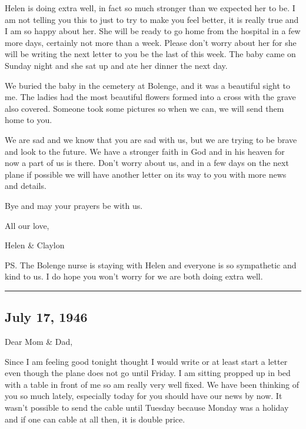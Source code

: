 \documentclass[
]{book}
\begin{document}
Helen is doing extra well, in fact so much stronger than we expected her to be. I am not telling you this to just to try to make you feel better, it is really true and I am so happy about her. She will be ready to go home from the hospital in a few more days, certainly not more than a week. Please don't worry about her for she will be writing the next letter to you be the last of this week. The baby came on Sunday night and she sat up and ate her dinner the next day.

We buried the baby in the cemetery at Bolenge, and it was a beautiful sight to me. The ladies had the most beautiful flowers formed into a cross with the grave also covered. Someone took some pictures so when we can, we will send them home to you.

We are sad and we know that you are sad with us, but we are trying to be brave and look to the future. We have a stronger faith in God and in his heaven for now a part of us is there. Don't worry about us, and in a few days on the next plane if possible we will have another letter on its way to you with more news and details.

Bye and may your prayers be with us.

All our love,

Helen \& Claylon

PS. The Bolenge nurse is staying with Helen and everyone is so sympathetic and kind to us. I do hope you won't worry for we are both doing extra well.

\begin{center}\rule{0.5\linewidth}{0.5pt}\end{center}

\hypertarget{july-17-1946}{%
\subsection{July 17, 1946}\label{july-17-1946}}

Dear Mom \& Dad,

Since I am feeling good tonight thought I would write or at least start a letter even though the plane does not go until Friday. I am sitting propped up in bed with a table in front of me so am really very well fixed. We have been thinking of you so much lately, especially today for you should have our news by now. It wasn't possible to send the cable until Tuesday because Monday was a holiday and if one can cable at all then, it is double price.
\end{document}

